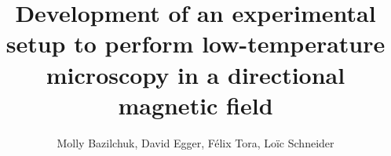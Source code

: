 \documentclass[journal]{IEEEtran}
\begin{document}
%
\title{Development of an experimental setup to perform low-temperature microscopy in a directional magnetic field}
%
%
%

\author{Molly Bazilchuk, 
David Egger, 
Félix Tora, 
Loïc Schneider}%

% 
%




% 
\end{document}
